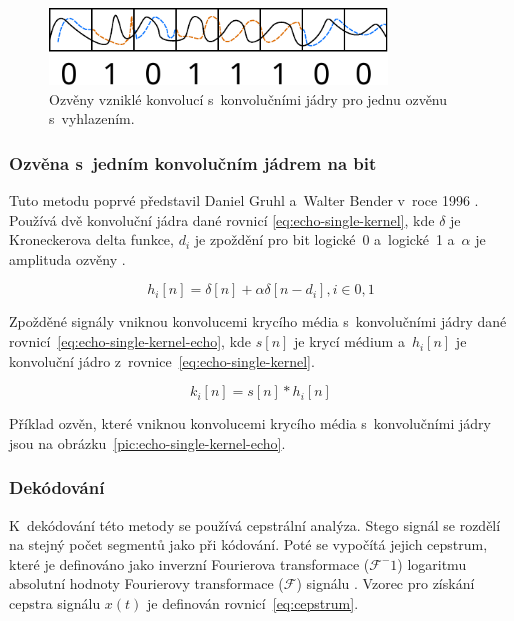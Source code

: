 \begin{figure}[hbt]
    \centering
    \includegraphics[width=0.8\textwidth]{obrazky/echo-smoothed.pdf}
    \caption{Ozvěny vzniklé konvolucí s~konvolučními jádry pro jednu ozvěnu
    s~vyhlazením.}
    \label{pic:echo-single-kernel-echo-smooth}
\end{figure}

\subsubsection*{Ozvěna s~jedním konvolučním jádrem na bit}
\label{ssub:echo-single-kernel}

Tuto metodu poprvé představil Daniel Gruhl a~Walter Bender v~roce 1996
\cite{Gruhl1996}. Používá dvě konvoluční jádra dané rovnicí
\ref{eq:echo-single-kernel}, kde $\delta$ je Kroneckerova delta funkce, $d_i$
je zpoždění pro bit logické~0 a~logické~1 a~$\alpha$ je amplituda ozvěny
\cite{Dutta2020}.

\begin{equation}
    \label{eq:echo-single-kernel}
    h_i[n] = \delta[n] + \alpha\delta[n - d_i], i \in {0, 1}
\end{equation}

\noindent Zpožděné signály vniknou konvolucemi krycího média s~konvolučními
jádry dané rovnicí~\ref{eq:echo-single-kernel-echo}, kde $s[n]$ je krycí médium
a~$h_i[n]$ je konvoluční jádro z~rovnice~\ref{eq:echo-single-kernel}.

\begin{equation}
    \label{eq:echo-single-kernel-echo}
    k_i[n] = s[n] * h_i[n]
\end{equation}

\noindent Příklad ozvěn, které vniknou konvolucemi krycího média s~konvolučními
jádry jsou na obrázku~\ref{pic:echo-single-kernel-echo}.

\subsubsection*{Dekódování}
\label{ssub:echo-single-kernel-decoding}

K~dekódování této metody se používá cepstrální analýza. Stego signál se rozdělí
na stejný počet segmentů jako při kódování. Poté se vypočítá jejich cepstrum,
které je definováno jako inverzní Fourierova transformace ($\mathcal{F}^-1$)
logaritmu absolutní hodnoty Fourierovy transformace ($\mathcal{F}$) signálu
\cite{Tekeli2017}. Vzorec pro získání cepstra signálu $x(t)$ je definován
rovnicí~\ref{eq:cepstrum}.

